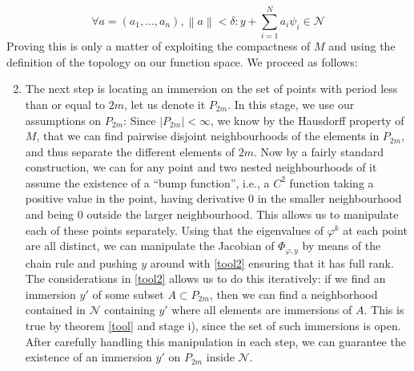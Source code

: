 \documentclass[11pt, a4paper]{memoir}
\theoremstyle{break}
\theoremstyle{break}
\theoremstyle{nonumberplain}
\newcommand{\norm}[1]{\left\lVert#1\right\rVert}
\begin{document}
\begin{equation}\label{tool2}
\forall a=(a_1,\ldots,a_n),\norm{a}< \delta: y+\sum_{i=1}^N a_i\psi_i\in \mathcal{N}
\end{equation}
Proving this is only a matter of exploiting the compactness of $M$ and using the definition of the topology on our function space. We proceed as follows:
\begin{enumerate}[label=\roman*)]
	\setcounter{enumi}{1}
	\item The next step is locating an immersion on the set of points with period less than or equal to $2m$, let us denote it $P_{2m}$. In this stage, we use our assumptions on $P_{2m}$: Since $|P_{2m}|<\infty$, we know by the Hausdorff property of $M$, that we can find pairwise disjoint neighbourhoods of the elements in $P_{2m}$, and thus separate the different elements of $2m$. Now by a fairly standard construction, we can for any point and two nested neighbourhoods of it assume the existence of a \enquote{bump function}, i.e., a $C^2$ function taking a positive value in the point, having derivative 0 in the smaller neighbourhood and being 0 outside the larger neighbourhood. This allows us to manipulate each of these points separately. Using that the eigenvalues of $\varphi^k$ at each point are all distinct, we can manipulate the Jacobian of $\Phi_{\varphi,y}$ by means of the chain rule and pushing $y$ around with \ref{tool2} ensuring that it has full rank. The considerations in \ref{tool2} allows us to do this iteratively: if we find an immersion $y'$ of some subset $A\subset P_{2m}$, then we can find a neighborhood contained in $\mathcal{N}$ containing $y'$ where all elements are immersions of $A$. This is true by theorem \ref{tool} and stage i), since the set of such immersions is open. After carefully handling this manipulation in each step, we can guarantee the existence of an immersion $y'$ on $P_{2m}$ inside $\mathcal{N}$.

\end{enumerate}
\end{document}
